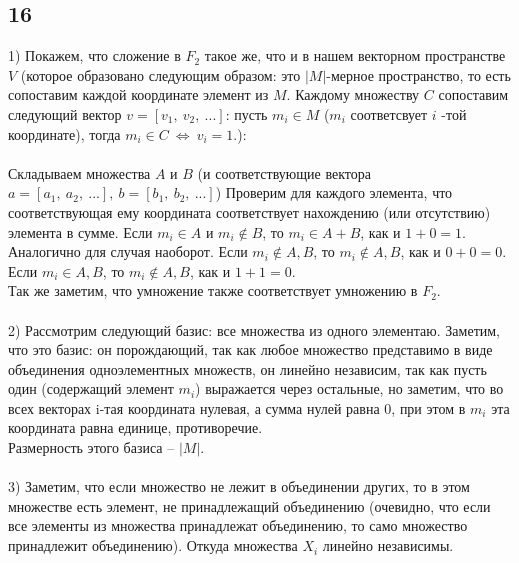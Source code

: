 		\subsection{16}
		1) Покажем, что сложение в $F_2$ такое же, что и в нашем векторном пространстве $V$ (которое образовано следующим образом: это $|M|$-мерное пространство, то есть сопоставим каждой координате элемент из $M$. Каждому множеству $C$ сопоставим следующий вектор $v = [v_1,\ v_2,\ ...]$: пусть $m_i \in M$ ($m_i$ соответсвует $i$	-той координате), тогда $m_i \in C\ \Leftrightarrow \ v_i = 1$.):\\
		\\
		Складываем множества $A$ и $B$ (и соответствующие вектора $a = [a_1,\ a_2,\ ...],\ b = [b_1,\ b_2,\ ...]$) Проверим для каждого элемента, что соответствующая ему координата соответствует нахождению (или отсутствию) элемента в сумме. Если $m_i \in A$ и $m_i \notin B$, то $m_i \in A+B$, как и $1 + 0 = 1$. Аналогично для случая наоборот. Если $m_i \notin A,B$, то $m_i \notin A,B$, как и $0 + 0 = 0$. Если $m_i \in A,B$, то $m_i \notin A,B$, как и $1 + 1 = 0$.\\
		Так же заметим, что умножение также соответствует умножению в $F_2$.\\
		\\
		2) Рассмотрим следующий базис: все множества из одного элементаю. Заметим, что это базис: он порождающий, так как любое множество представимо в виде объединения одноэлементных множеств, он линейно независим, так как пусть один (содержащий элемент $m_i$) выражается через остальные, но заметим, что во всех векторах i-тая координата нулевая, а сумма нулей равна $0$, при этом в $m_i$ эта координата равна единице, противоречие.\\
		Размерность этого базиса -- $|M|$.\\
		\\
		3) Заметим, что если множество не лежит в объединении других, то в этом множестве есть элемент, не принадлежащий объединению (очевидно, что если все элементы из множества принадлежат объединению, то само множество принадлежит объединению). Откуда множества $X_i$ линейно независимы.
		
		
